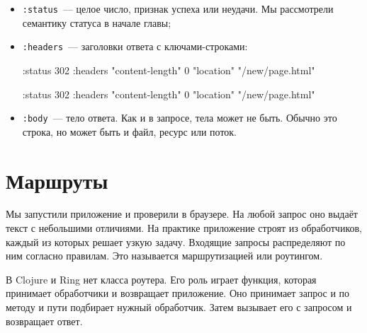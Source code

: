 \begin{itemize}

\item
  \verb|:status|~--- целое число, признак успеха или неудачи. Мы рассмотрели
  семантику статуса в начале главы;

\item
  \verb|:headers|~--- заголовки ответа с ключами-строками:


\ifx\devicetype\mobile

\begin{english}
  \begin{clojure}
{:status 302
 :headers
   {"content-length" 0
    "location" "/new/page.html"}}
  \end{clojure}
\end{english}

\else

\begin{english}
  \begin{clojure}
{:status 302
 :headers {"content-length" 0
           "location" "/new/page.html"}}
  \end{clojure}
\end{english}

\fi

\item
  \verb|:body|~--- тело ответа. Как и в запросе, тела может не быть. Обычно
  это строка, но может быть и файл, ресурс или поток.

\end{itemize}

\section{Маршруты}


Мы запустили приложение и проверили в браузере. На любой запрос оно выдаёт текст
с небольшими отличиями. На практике приложение строят из обработчиков, каждый из
которых решает узкую задачу. Входящие запросы распределяют по ним согласно
правилам. Это называется маршрутизацией или роутингом.

В Clojure и Ring нет класса роутера. Его роль играет функция, которая принимает
обработчики и возвращает приложение. Оно принимает запрос и по методу и пути
подбирает нужный обработчик. Затем вызывает его с запросом и возвращает ответ.


